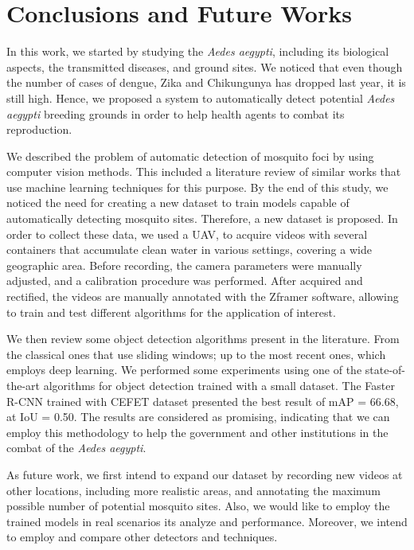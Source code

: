 \chapter{Conclusions and Future Works}
\label{chap:conclusions}

%
In this work, we started by studying the {\it Aedes aegypti}, including its biological aspects, the transmitted diseases, and ground sites.
We noticed that even though the number of cases of dengue, Zika and Chikungunya has dropped last year, it is still high.
Hence, we proposed a system to automatically detect potential \textit{Aedes aegypti} breeding grounds in order to help health agents to combat its reproduction.

We described the problem of automatic detection of mosquito foci by using computer vision methods.
This included a literature review of similar works that use machine learning techniques for this purpose.
By the end of this study, we noticed the need for creating a new dataset to train models capable of automatically detecting mosquito sites.
Therefore, a new dataset is proposed. 
In order to collect these data, we used a UAV, to acquire videos with several containers that accumulate clean water in various settings, covering a wide geographic area.
Before recording, the camera parameters were manually adjusted, and a calibration procedure was performed.
After acquired and rectified, the videos are manually annotated with the Zframer software, allowing to train and test different algorithms for the application of interest.

We then review some object detection algorithms present in the literature.
From the classical ones that use sliding windows; up to the most recent ones, which employs deep learning.
We performed some experiments using one of the state-of-the-art algorithms for object detection trained with a small dataset.
The Faster R-CNN trained with CEFET dataset presented the best result of mAP = 66.68, at IoU = 0.50.
The results are considered as promising, indicating that we can employ this methodology to help the government and other institutions in the combat of the {\textit{Aedes aegypti}}.


%
As future work, we first intend to expand our dataset by recording new videos at other locations, including more realistic areas, and annotating the maximum possible number of potential mosquito sites.
Also, we would like to employ the trained models in real scenarios its analyze and performance.
Moreover, we intend to employ and compare other detectors and techniques.

